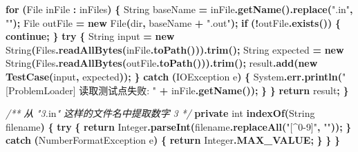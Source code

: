 \documentclass[
  11pt,
]{ctexart}
\newenvironment{Shaded}{\begin{snugshade}}{\end{snugshade}}
\newcommand{\BuiltInTok}[1]{#1}
\newcommand{\CommentTok}[1]{\textcolor[rgb]{0.56,0.35,0.01}{\textit{#1}}}
\newcommand{\ControlFlowTok}[1]{\textcolor[rgb]{0.13,0.29,0.53}{\textbf{#1}}}
\newcommand{\DataTypeTok}[1]{\textcolor[rgb]{0.13,0.29,0.53}{#1}}
\newcommand{\FunctionTok}[1]{\textcolor[rgb]{0.13,0.29,0.53}{\textbf{#1}}}
\newcommand{\KeywordTok}[1]{\textcolor[rgb]{0.13,0.29,0.53}{\textbf{#1}}}
\newcommand{\NormalTok}[1]{#1}
\newcommand{\OperatorTok}[1]{\textcolor[rgb]{0.81,0.36,0.00}{\textbf{#1}}}
\newcommand{\StringTok}[1]{\textcolor[rgb]{0.31,0.60,0.02}{#1}}
\begin{document}
\begin{Shaded}
\begin{Highlighting}[]
        \ControlFlowTok{for} \OperatorTok{(}\BuiltInTok{File}\NormalTok{ inFile }\OperatorTok{:}\NormalTok{ inFiles}\OperatorTok{)} \OperatorTok{\{}
            \BuiltInTok{String}\NormalTok{ baseName }\OperatorTok{=}\NormalTok{ inFile}\OperatorTok{.}\FunctionTok{getName}\OperatorTok{().}\FunctionTok{replace}\OperatorTok{(}\StringTok{".in"}\OperatorTok{,} \StringTok{""}\OperatorTok{);}
            \BuiltInTok{File}\NormalTok{ outFile }\OperatorTok{=} \KeywordTok{new} \BuiltInTok{File}\OperatorTok{(}\NormalTok{dir}\OperatorTok{,}\NormalTok{ baseName }\OperatorTok{+} \StringTok{".out"}\OperatorTok{);}
            \ControlFlowTok{if} \OperatorTok{(!}\NormalTok{outFile}\OperatorTok{.}\FunctionTok{exists}\OperatorTok{())} \OperatorTok{\{}
                \ControlFlowTok{continue}\OperatorTok{;}
            \OperatorTok{\}}
            \ControlFlowTok{try} \OperatorTok{\{}
                \BuiltInTok{String}\NormalTok{ input }\OperatorTok{=} \KeywordTok{new} \BuiltInTok{String}\OperatorTok{(}\NormalTok{Files}\OperatorTok{.}\FunctionTok{readAllBytes}\OperatorTok{(}\NormalTok{inFile}\OperatorTok{.}\FunctionTok{toPath}\OperatorTok{())).}\FunctionTok{trim}\OperatorTok{();}
                \BuiltInTok{String}\NormalTok{ expected }\OperatorTok{=} \KeywordTok{new} \BuiltInTok{String}\OperatorTok{(}\NormalTok{Files}\OperatorTok{.}\FunctionTok{readAllBytes}\OperatorTok{(}\NormalTok{outFile}\OperatorTok{.}\FunctionTok{toPath}\OperatorTok{())).}\FunctionTok{trim}\OperatorTok{();}
\NormalTok{                result}\OperatorTok{.}\FunctionTok{add}\OperatorTok{(}\KeywordTok{new} \FunctionTok{TestCase}\OperatorTok{(}\NormalTok{input}\OperatorTok{,}\NormalTok{ expected}\OperatorTok{));}
            \OperatorTok{\}} \ControlFlowTok{catch} \OperatorTok{(}\BuiltInTok{IOException}\NormalTok{ e}\OperatorTok{)} \OperatorTok{\{}
                \BuiltInTok{System}\OperatorTok{.}\FunctionTok{err}\OperatorTok{.}\FunctionTok{println}\OperatorTok{(}\StringTok{"[ProblemLoader] 读取测试点失败: "} \OperatorTok{+}\NormalTok{ inFile}\OperatorTok{.}\FunctionTok{getName}\OperatorTok{());}
            \OperatorTok{\}}
        \OperatorTok{\}}
        \ControlFlowTok{return}\NormalTok{ result}\OperatorTok{;}
    \OperatorTok{\}}

    \CommentTok{/**} \CommentTok{从} \CommentTok{"3.}\NormalTok{in}\CommentTok{"} \CommentTok{这样的文件名中提取数字} \CommentTok{3} \CommentTok{*/}
    \KeywordTok{private} \DataTypeTok{int} \FunctionTok{indexOf}\OperatorTok{(}\BuiltInTok{String}\NormalTok{ filename}\OperatorTok{)} \OperatorTok{\{}
        \ControlFlowTok{try} \OperatorTok{\{}
            \ControlFlowTok{return} \BuiltInTok{Integer}\OperatorTok{.}\FunctionTok{parseInt}\OperatorTok{(}\NormalTok{filename}\OperatorTok{.}\FunctionTok{replaceAll}\OperatorTok{(}\StringTok{"[\^{}0{-}9]"}\OperatorTok{,} \StringTok{""}\OperatorTok{));}
        \OperatorTok{\}} \ControlFlowTok{catch} \OperatorTok{(}\BuiltInTok{NumberFormatException}\NormalTok{ e}\OperatorTok{)} \OperatorTok{\{}
            \ControlFlowTok{return} \BuiltInTok{Integer}\OperatorTok{.}\FunctionTok{MAX\_VALUE}\OperatorTok{;}
        \OperatorTok{\}}
    \OperatorTok{\}}
\OperatorTok{\}}
\end{Highlighting}
\end{Shaded}
\end{document}
